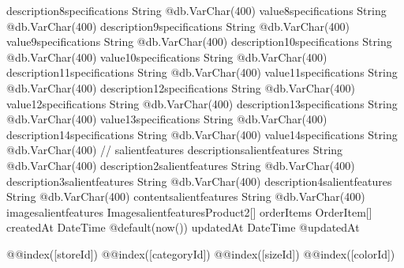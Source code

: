 {  description8specifications   String                         @db.VarChar(400)
  value8specifications         String                         @db.VarChar(400)
  description9specifications   String                         @db.VarChar(400)
  value9specifications         String                         @db.VarChar(400)
  description10specifications  String                         @db.VarChar(400)
  value10specifications        String                         @db.VarChar(400)
  description11specifications  String                         @db.VarChar(400)
  value11specifications        String                         @db.VarChar(400)
  description12specifications  String                         @db.VarChar(400)
  value12specifications        String                         @db.VarChar(400)
  description13specifications  String                         @db.VarChar(400)
  value13specifications        String                         @db.VarChar(400)
  description14specifications  String                         @db.VarChar(400)
  value14specifications        String                         @db.VarChar(400)
  // salientfeatures
  descriptionsalientfeatures   String                         @db.VarChar(400)
  description2salientfeatures  String                         @db.VarChar(400)
  description3salientfeatures  String                         @db.VarChar(400)
  description4salientfeatures  String                         @db.VarChar(400)
  contentsalientfeatures       String                         @db.VarChar(400)
  imagesalientfeatures ImagesalientfeaturesProduct2[]
  orderItems                   OrderItem[]
  createdAt                    DateTime                       @default(now())
  updatedAt                    DateTime                       @updatedAt

  @@index([storeId])
  @@index([categoryId])
  @@index([sizeId])
  @@index([colorId])
}

